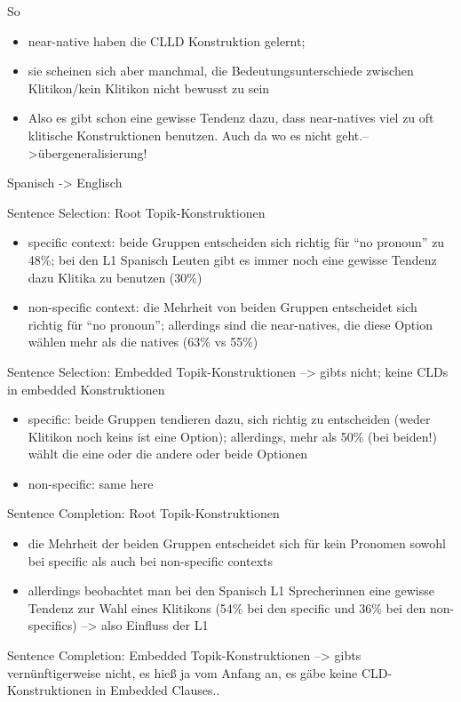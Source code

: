 So
\begin{itemize}
    \item near-native haben die CLLD Konstruktion gelernt;
    \item sie scheinen sich aber manchmal, die Bedeutungsunterschiede zwischen Klitikon/kein Klitikon nicht bewusst zu sein
    \item Also es gibt schon eine gewisse Tendenz dazu, dass near-natives viel zu oft klitische Konstruktionen benutzen. Auch da wo es nicht geht.-->übergeneralisierung!
\end{itemize}

Spanisch -> Englisch

Sentence Selection: Root Topik-Konstruktionen
\begin{itemize}
    \item specific context: beide Gruppen entscheiden sich richtig für ``no pronoun'' zu 48\%; bei den L1 Spanisch Leuten gibt es immer noch eine gewisse Tendenz dazu Klitika zu benutzen (30\%)
    \item non-specific context: die Mehrheit von beiden Gruppen entscheidet sich richtig für ``no pronoun''; allerdings sind die near-natives, die diese Option wählen mehr als die natives (63\% vs 55\%)
\end{itemize}

Sentence Selection: Embedded Topik-Konstruktionen --> gibts nicht; keine CLDs in embedded Konstruktionen
\begin{itemize}
    \item specific: beide Gruppen tendieren dazu, sich richtig zu entscheiden (weder Klitikon noch keins ist eine Option); allerdings, mehr als 50\% (bei beiden!) wählt die eine oder die andere oder beide Optionen
    \item non-specific: same here
\end{itemize}

Sentence Completion: Root Topik-Konstruktionen
\begin{itemize}
    \item die Mehrheit der beiden Gruppen entscheidet sich für kein Pronomen sowohl bei specific als auch bei non-specific contexts
    \item allerdings beobachtet man bei den Spanisch L1 Sprecherinnen eine gewisse Tendenz zur Wahl eines Klitikons (54\% bei den specific und 36\% bei den non-specifics) --> also Einfluss der L1
\end{itemize}

Sentence Completion: Embedded Topik-Konstruktionen
--> gibts vernünftigerweise nicht, es hieß ja vom Anfang an, es gäbe keine CLD-Konstruktionen in Embedded Clauses..

